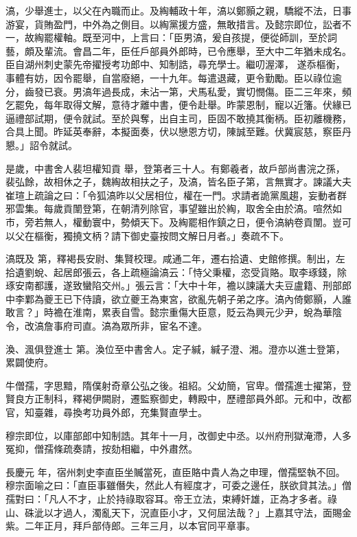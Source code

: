 \begin{pinyinscope}
 滈，少舉進士，以父在內職而止。及綯輔政十年，滈以鄭顥之親，驕縱不法，日事游宴，貨賄盈門，中外為之側目。以綯黨援方盛，無敢措言。及懿宗即位，訟者不一，故綯罷權軸。既至河中，上言曰：「臣男滈，爰自孩提，便從師訓，至於詞藝，頗及輩流。會昌二年，臣任戶部員外郎時，已令應舉，至大中二年猶未成名。臣自湖州刺史蒙先帝擢授考功郎中、知制誥，尋充學士。繼叨渥澤，
 遂忝樞衡，事體有妨，因令罷舉，自當廢絕，一十九年。每遣退藏，更令勤勵。臣以祿位逾分，齒發已衰。男滈年過長成，未沾一第，犬馬私愛，實切憫傷。臣二三年來，頻乞罷免，每年取得文解，意待才離中書，便令赴舉。昨蒙恩制，寵以近籓。伏緣已逼禮部試期，便令就試。至於與奪，出自主司，臣固不敢撓其衡柄。臣初離機務，合具上聞。昨延英奉辭，本擬面奏，伏以戀恩方切，陳誠至難。伏冀宸慈，察臣丹懇。」詔令就試。



 是歲，中書舍人裴坦權知貢
 舉，登第者三十人。有鄭羲者，故戶部尚書浣之孫，裴弘餘，故相休之子，魏綯故相扶之子，及滈，皆名臣子第，言無實才。諫議大夫崔瑄上疏論之曰：「令狐滈昨以父居相位，權在一門。求請者詭黨風趨，妄動者群邪雲集。每歲貢闈登第，在朝清列除官，事望雖出於綯，取舍全由於滈。喧然如市，旁若無人，權動寰中，勢傾天下。及綯罷相作鎮之日，便令滈納卷貢闈。豈可以父在樞衡，獨撓文柄？請下御史臺按問文解日月者。」奏疏不下。



 滈既及
 第，釋褐長安尉、集賢校理。咸通二年，遷右拾遺、史館修撰。制出，左拾遺劉蛻、起居郎張云，各上疏極論滈云：「恃父秉權，恣受貨賂。取李琢錢，除琢安南都護，遂致蠻陷交州。」張云言：「大中十年，襜以諫議大夫豆盧籍、刑部郎中李鄴為夔王已下侍讀，欲立夔王為東宮，欲亂先朝子弟之序。滈內倚鄭顥，人誰敢言？」時襜在淮南，累表自雪。懿宗重傷大臣意，貶云為興元少尹，蛻為華陰令，改滈詹事府司直。滈為眾所非，宦名不達。



 渙、渢俱登進士
 第。渙位至中書舍人。定子緘，緘子澄、湘。澄亦以進士登第，累闢使府。



 牛僧孺，字思黯，隋僕射奇章公弘之後。祖紹。父幼簡，官卑。僧孺進士擢第，登賢良方正制科，釋褐伊闕尉，遷監察御史，轉殿中，歷禮部員外郎。元和中，改都官，知臺雜，尋換考功員外郎，充集賢直學士。



 穆宗即位，以庫部郎中知制誥。其年十一月，改御史中丞。以州府刑獄淹滯，人多冤抑，僧孺條疏奏請，按劾相繼，中外肅然。



 長慶元
 年，宿州刺史李直臣坐贓當死，直臣賂中貴人為之申理，僧孺堅執不回。穆宗面喻之曰：「直臣事雖僭失，然此人有經度才，可委之邊任，朕欲貸其法。」僧孺對曰：「凡人不才，止於持祿取容耳。帝王立法，束縛奸雄，正為才多者。祿山、硃泚以才過人，濁亂天下，況直臣小才，又何屈法哉？」上嘉其守法，面賜金紫。二年正月，拜戶部侍郎。三年三月，以本官同平章事。




\end{pinyinscope}
